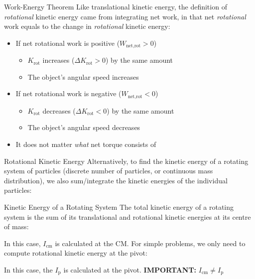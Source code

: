 \documentclass[12pt,compress,aspectratio=169]{beamer}
\begin{document}
\begin{frame}{Work-Energy Theorem}
  Like translational kinetic energy, the definition of \emph{rotational}
  kinetic energy came from integrating net work, in that net \emph{rotational}
  work equals to the change in \emph{rotational} kinetic energy:

  \begin{itemize}
  \item If net rotational work is positive ($W_\text{net,rot}>0$)
    \begin{itemize}
    \item $K_\text{rot}$ increases ($\Delta K_\text{rot}>0$) by the same amount
    \item The object's angular speed increases
    \end{itemize}
  \item If net rotational work is negative ($W_\text{net,rot}<0$)
    \begin{itemize}
    \item $K_\text{rot}$ decreases ($\Delta K_\text{rot}<0$) by the same amount
    \item The object's angular speed decreases
    \end{itemize}
  \item It does not matter \emph{what} net torque consists of
  \end{itemize}
\end{frame}




\begin{frame}{Rotational Kinetic Energy}
  Alternatively, to find the kinetic energy of a rotating system of particles
  (discrete number of particles, or continuous mass distribution), we also
  sum/integrate the kinetic energies of the individual particles:
    
\end{frame}



\begin{frame}{Kinetic Energy of a Rotating System}
  The total kinetic energy of a rotating system is the sum of its translational
  and rotational kinetic energies at its centre of mass:

  
  In this case, $I_\text{cm}$ is calculated at the CM. For simple problems, we
  only need to compute rotational kinetic energy at the pivot:

  
  In this case, the $I_\text{p}$ is calculated at the pivot.
  \textbf{IMPORTANT:} $I_\text{cm}\neq I_\text{p}$
\end{frame}
\end{document}
